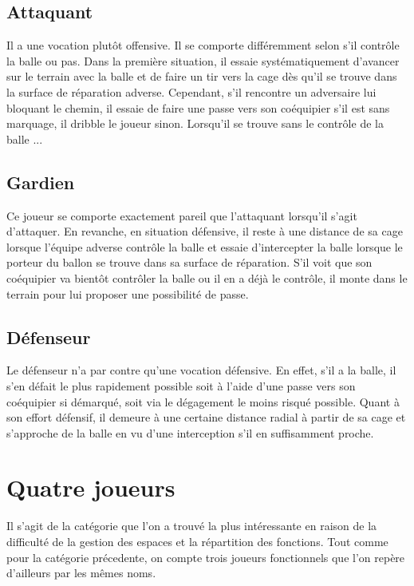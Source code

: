 \documentclass[12pt,a4paper]{article}
\begin{document}
\subsection*{Attaquant}
Il a une vocation plut\^ot offensive. Il se comporte diff\'eremment selon 
s'il contr\^ole la balle ou pas. Dans la premi\`ere situation, il essaie 
syst\'ematiquement d'avancer sur le terrain avec la balle et de faire un tir 
vers la cage d\`es qu'il se trouve dans la surface de r\'eparation adverse. 
Cependant, s'il rencontre un adversaire lui bloquant le chemin, il essaie de 
faire une passe vers son co\'equipier s'il est sans marquage, il dribble le 
joueur sinon. Lorsqu'il se trouve sans le contr\^ole de la balle ...

\subsection*{Gardien}
Ce joueur se comporte exactement pareil que l'attaquant lorsqu'il s'agit 
d'attaquer. En revanche, en situation d\'efensive, il reste \`a une 
distance de sa cage lorsque l'\'equipe adverse contr\^ole la balle et essaie 
d'intercepter la balle lorsque le porteur du ballon se trouve dans sa surface 
de r\'eparation. S'il voit que son co\'equipier va bient\^ot contr\^oler la 
balle ou il en a d\'ej\`a le contr\^ole, il monte dans le terrain pour lui 
proposer une possibilit\'e de passe.

\subsection*{D\'efenseur}
Le d\'efenseur n'a par contre qu'une vocation d\'efensive. En effet, s'il a la 
balle, il s'en d\'efait le plus rapidement possible soit \`a l'aide d'une passe 
vers son co\'equipier si d\'emarqu\'e, soit via le d\'egagement le moins 
risqu\'e possible. Quant \`a son effort d\'efensif, il demeure \`a une certaine 
distance radial \`a partir de sa cage et s'approche de la balle en vu d'une 
interception s'il en suffisamment proche.

\section*{Quatre joueurs}
Il s'agit de la cat\'egorie que l'on a trouv\'e la plus int\'eressante en 
raison de la difficult\'e de la gestion des espaces et la r\'epartition des 
fonctions. Tout comme pour la cat\'egorie pr\'ecedente, on compte trois 
joueurs fonctionnels que l'on rep\`ere d'ailleurs par les m\^emes noms. 
\end{document}
